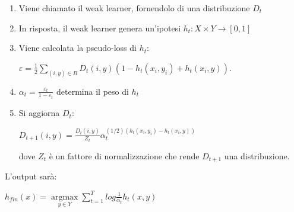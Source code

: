 \begin{enumerate}

\item Viene chiamato il weak learner, fornendolo di una distribuzione
    \begin{math} D_t\end{math} 
\item In risposta, il weak learner genera un'ipotesi  \begin{math}h_t : X \times Y \to \left[0,1\right]\end{math}
\item Viene calcolata la pseudo-loss di \begin{math}h_t\end{math}:
\begin{center}
\begin{math}\varepsilon = \frac{1}{2} \sum_{(i,y)\in B}D_t(i,y)(1-h_t(x_i,y_i)+h_t(x_i,y))\end{math}.
\end{center}                      
\item \begin{math} \alpha_t=\frac{\varepsilon_t}{1-\varepsilon_t}  \end{math} 
determina il peso di \begin{math} h_t\end{math}

\item Si aggiorna \begin{math}D_t\end{math}:
\begin{center}
 \begin{math}
  D_{t+1}(i,y)=\frac{D_t(i,y)}{Z_t}\alpha_t^{(1/2)(h_t(x_i,y_i)-h_t(x_i,y))}
 \end{math}

\end{center}
                             
dove \begin{math}Z_t \end{math} \`e un fattore di normalizzazione che rende \begin{math}D_{t+1} \end{math} 
una distribuzione.


\end{enumerate}
L'output sar\`a:
\begin{center}
\begin{math} h_{fin}(x)= \underset{y\in Y}{\operatorname{argmax}}\sum_{t=1}^T log\frac{1}{\alpha_t}h_t(x,y) \end{math}
\end{center}



